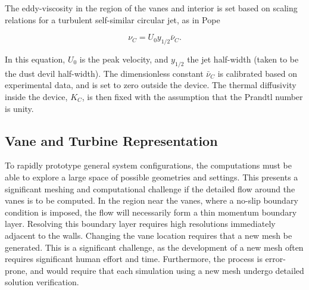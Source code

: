 The eddy-viscosity in the region of the vanes and interior is set based
on scaling relations for a turbulent self-similar circular jet, as in 
Pope\cite{pope2000turbulent}
 
\begin{equation}
  \nu_C = U_0 y_{1/2} \bar \nu_C.
\end{equation}

In this equation, $U_0$ is the peak velocity, and $y_{1/2}$ the jet
half-width (taken to be the dust devil half-width).  
The dimensionless constant $\bar \nu_C $ is calibrated based on
experimental data, and is set to zero outside the device. 
The thermal diffusivity inside the device, $K_C$, is then fixed with the 
assumption that the Prandtl number is unity.  




\subsection{Vane and Turbine Representation}
\label{subsec:vane}
To rapidly prototype general system configurations, the
computations must be able to explore a large space of possible
geometries and settings. This presents a significant meshing and 
computational challenge if the detailed flow around the vanes is to be
computed. In the region near the vanes, where a no-slip boundary
condition is imposed, the flow will necessarily form a thin momentum
boundary layer. Resolving this boundary layer requires high resolutions
immediately adjacent to the walls. Changing the vane location requires
that a new mesh be generated.
This is a significant
challenge, as the development of a new mesh often requires significant
human effort and time. Furthermore, the process is error-prone, 
and would require that each simulation using a new mesh undergo 
detailed solution verification. 



